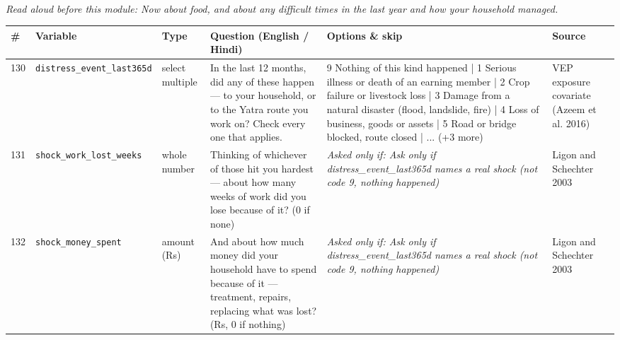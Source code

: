 \documentclass[9pt,a4paper,landscape]{article}
\begin{document}
\\[3pt]
{\small\itshape Read aloud before this module: Now about food, and about any difficult times in the last year and how your household managed.}\\[5pt]
\begin{longtable}{@{}p{0.5cm}p{3.3cm}p{1.7cm}p{7.3cm}p{5.6cm}p{5.4cm}@{}}
\toprule \footnotesize\textbf{\#} & \footnotesize\textbf{Variable} & \footnotesize\textbf{Type} & \footnotesize\textbf{Question (English / Hindi)} & \footnotesize\textbf{Options {\&} skip} & \footnotesize\textbf{Source}\\ \midrule
\endhead
\footnotesize 130 & \footnotesize\texttt{distress\_event\_last365d} & \scriptsize select multiple & \footnotesize In the last 12 months, did any of these happen — to your household, or to the Yatra route you work on? Check every one that applies.\par\vspace{1pt}{\footnotesize\color{hdr}{\hifont पिछले 12 महीनों में इनमें से क्या-क्या हुआ — आपके घर के साथ, या जिस यात्रा मार्ग पर आप काम करते हैं उस पर? जो-जो हुआ, सब चुनिए।}} & \scriptsize 9 Nothing of this kind happened | 1 Serious illness or death of an earning member | 2 Crop failure or livestock loss | 3 Damage from a natural disaster (flood, landslide, fire) | 4 Loss of business, goods or assets | 5 Road or bridge blocked, route closed | ... (+3 more) & \scriptsize VEP exposure covariate (Azeem et al. 2016)\\
\footnotesize 131 & \footnotesize\texttt{shock\_work\_lost\_weeks} & \scriptsize whole number & \footnotesize Thinking of whichever of those hit you hardest — about how many weeks of work did you lose because of it? (0 if none)\par\vspace{1pt}{\footnotesize\color{hdr}{\hifont इनमें से जो सबसे भारी पड़ा — उसके कारण लगभग कितने हफ़्ते का काम छूटा? (कुछ न छूटा हो तो 0)}} & \scriptsize \textit{Asked only if: Ask only if distress\_event\_last365d names a real shock (not code 9, nothing happened)} & \scriptsize Ligon and Schechter 2003\\
\footnotesize 132 & \footnotesize\texttt{shock\_money\_spent} & \scriptsize amount (Rs) & \footnotesize And about how much money did your household have to spend because of it — treatment, repairs, replacing what was lost? (Rs, 0 if nothing)\par\vspace{1pt}{\footnotesize\color{hdr}{\hifont और उसके कारण आपके घर को लगभग कितना पैसा ख़र्च करना पड़ा — इलाज, मरम्मत, जो नुक़सान हुआ उसे पूरा करना? (रुपये, कुछ नहीं तो 0)}} & \scriptsize \textit{Asked only if: Ask only if distress\_event\_last365d names a real shock (not code 9, nothing happened)} & \scriptsize Ligon and Schechter 2003\\

\end{longtable}
\end{document}
